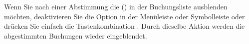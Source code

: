 \begin{enumerate}
\end{enumerate}

Wenn Sie nach einer Abstimmung die  () in der Buchungsliste ausblenden möchten, deaktivieren Sie die Option  in der Menüleiste oder Symbolleiste oder drücken Sie einfach die Tastenkombination . Durch dieselbe Aktion werden die abgestimmten Buchungen wieder eingeblendet.

